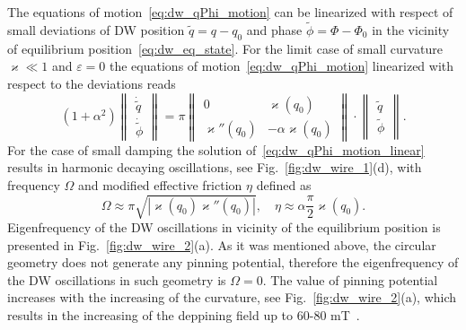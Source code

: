 \documentclass[runningheads]{llncs}
\begin{document}
The equations of motion~\eqref{eq:dw_qPhi_motion} can be linearized with respect of small deviations of DW position $\tilde{q}=q-q_0$ and phase $\tilde{\phi}=\Phi-\Phi_0$ in the vicinity of equilibrium position~\eqref{eq:dw_eq_state}. For the limit case of small curvature $\varkappa\ll1$ and $\varepsilon=0$ the equations of motion~\eqref{eq:dw_qPhi_motion} linearized with respect to the deviations reads~\cite{Yershov15b}
\begin{equation}\label{eq:dw_qPhi_motion_linear}
\left(1+\alpha^2\right)\left\|\begin{matrix}
\dot{\tilde{q}}\\
\dot{\tilde{\phi}}
\end{matrix}\right\|=\pi\left\|\begin{matrix}
0 & \varkappa(q_0)\\
\varkappa''(q_0)&-\alpha\varkappa(q_0)
\end{matrix}\right\|\cdot\left\|\begin{matrix}
\tilde{q}\\
\tilde{\phi}
\end{matrix}\right\|.
\end{equation}
For the case of small damping the solution of~\eqref{eq:dw_qPhi_motion_linear} results in harmonic decaying oscillations, see Fig.~\ref{fig:dw_wire_1}(d), with frequency $\Omega$ and modified effective friction $\eta$ defined as
\begin{equation}
\Omega \approx \pi\sqrt{|\varkappa(q_0)\varkappa''(q_0)|},\quad \eta\approx \alpha\frac{\pi}{2}\varkappa(q_0).
\end{equation}
Eigenfrequency of the DW oscillations in vicinity of the equilibrium position is presented in Fig.~\ref{fig:dw_wire_2}(a). As it was mentioned above, the circular geometry does not generate any pinning potential, therefore the eigenfrequency of the DW oscillations in such geometry is $\Omega=0$. The value of pinning potential increases with the increasing of the curvature, see Fig.~\ref{fig:dw_wire_2}(a), which results in the increasing of the deppining field up to 60-80 mT~\cite{Volkov19c,Lewis09}.
\end{document}
